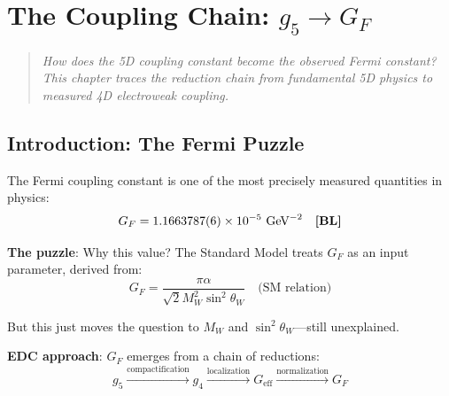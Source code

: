 \chapter{The Coupling Chain: $g_5 \to G_F$}
\label{ch:gf_chain}

\begin{quote}
\textit{How does the 5D coupling constant become the observed Fermi constant?
This chapter traces the reduction chain from fundamental 5D physics to
measured 4D electroweak coupling.}
\end{quote}

\section{Introduction: The Fermi Puzzle}
\label{sec:gf_intro}

The Fermi coupling constant is one of the most precisely measured
quantities in physics:
\begin{equation}
G_F = 1.1663787(6) \times 10^{-5} \text{ GeV}^{-2} \quad \textbf{[BL]}
\end{equation}

\textbf{The puzzle}: Why this value? The Standard Model treats $G_F$ as
an input parameter, derived from:
\begin{equation}
G_F = \frac{\pi \alpha}{\sqrt{2} M_W^2 \sin^2\theta_W} \quad \text{(SM relation)}
\end{equation}

But this just moves the question to $M_W$ and $\sin^2\theta_W$---still
unexplained.

\textbf{EDC approach}: $G_F$ emerges from a chain of reductions:
\begin{equation}
g_5 \xrightarrow{\text{compactification}} g_4 \xrightarrow{\text{localization}}
G_{\text{eff}} \xrightarrow{\text{normalization}} G_F
\end{equation}

\begin{center}
\end{center}

